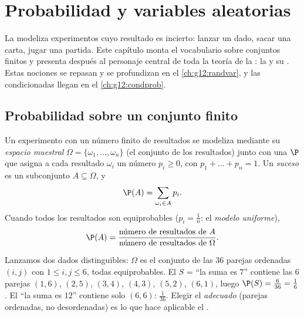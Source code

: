 \chapter{Probabilidad y variables aleatorias}\label{ch:g11:prob}

La  modeliza experimentos cuyo resultado es incierto: lanzar un
dado, sacar una carta, jugar una partida. Este capítulo monta el
vocabulario sobre conjuntos finitos y presenta después al personaje central
de toda la teoría de la : la \emph{} y su
\emph{}. Estas nociones se repasan y se profundizan en el
\cref{ch:g12:randvar}, y las  condicionadas llegan en el
\cref{ch:g12:condprob}.

\section{Probabilidad sobre un conjunto finito}

\begin{definition}\label{def:g11:prob:model}
Un experimento con un número finito de resultados se modeliza mediante su
\emph{espacio muestral}
$\Omega = \{\omega_1, \dots, \omega_n\}$ (el conjunto de los resultados)
junto con una \emph{} $\P$ que asigna a cada resultado
$\omega_i$ un número $p_i \geq 0$, con $p_1 + \dots + p_n = 1$. Un
\emph{suceso} es un subconjunto $A \subseteq \Omega$, y
\[
\P(A) = \sum_{\omega_i \in A} p_i .
\]
Cuando todos los resultados son equiprobables ($p_i = \frac1n$: el
\emph{modelo uniforme}),
\[
\P(A) = \frac{\text{número de resultados de } A}
{\text{número de resultados de } \Omega}.
\]
\end{definition}

\begin{example}\label{ex:g11:prob:twodice}
Lanzamos dos dados distinguibles: $\Omega$ es el conjunto de las $36$
parejas ordenadas $(i, j)$ con $1 \leq i, j \leq 6$, todas equiprobables.
El  $S$ = ``la suma es $7$'' contiene las $6$ parejas
$(1,6)$, $(2,5)$, $(3,4)$, $(4,3)$, $(5,2)$, $(6,1)$, luego
$\P(S) = \frac{6}{36} = \frac16$. El  ``la suma es $12$'' contiene
solo $(6,6)$:  $\frac{1}{36}$. Elegir el 
\emph{adecuado} (parejas ordenadas, no desordenadas) es lo que hace
aplicable el .
\end{example}

